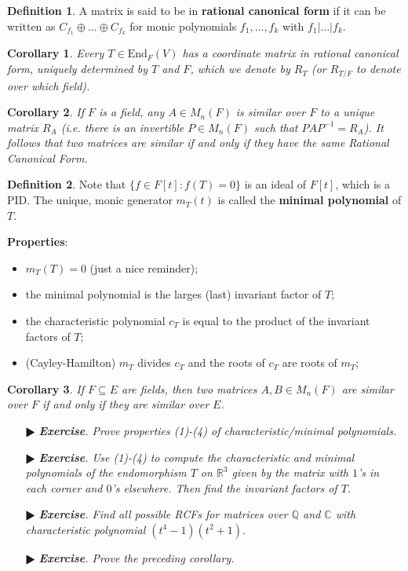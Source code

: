 \documentclass[11pt]{amsart}
\newtheorem*{corollary*}{Corollary}
\theoremstyle{definition}
\newtheorem*{definition*}{Definition}
\renewcommand\:{\colon}
\newcommand{\Q}{\mathds{Q}}
\newcommand{\R}{\mathds{R}}
\newcommand{\1}{\mathds{1}}
\newcommand{\End}{\text{End}}
\newcommand{\exc}[1]{\vspace{-2.5pt}\begin{itemize}[leftmargin=15pt]\item[$\RHD$] \textit{\textbf{Exercise}. #1}\end{itemize}}
\begin{document}
\begin{definition*}
	A matrix is said to be in \textbf{rational canonical form} if it can be written as $C_{f_1} \oplus \dots \oplus C_{f_k}$ for monic polynomials $f_1, \dots, f_k$ with $f_1 | \dots | f_k$.
\end{definition*}

\begin{corollary*}
	Every $T \in \End_F(V)$ has a coordinate matrix in rational canonical form, uniquely determined by $T$ and $F$, which we denote by $R_T$ (or $R_{T/F}$ to denote over which field).
\end{corollary*}

\begin{corollary*}
	If $F$ is a field, any $A \in M_n(F)$ is similar over $F$ to a unique matrix $R_A$ (i.e. there is an invertible $P \in M_n(F)$ such that $PAP^{-1} = R_A$). It follows that two matrices are similar if and only if they have the same Rational Canonical Form.
\end{corollary*}

\begin{definition*}
	Note that $\{ f \in F[t] : f(T) = 0 \}$ is an ideal of $F[t]$, which is a PID. The unique, monic generator $m_T(t)$ is called the \textbf{minimal polynomial} of $T$.
\end{definition*}

\noindent \textbf{Properties}:
\begin{itemize}[leftmargin=*]\setlength\itemsep{0em}
	\item $m_T(T) = 0$ (just a nice reminder);
	\item the minimal polynomial is the larges (last) invariant factor of $T$;
	\item the characteristic polynomial $c_T$ is equal to the product of the invariant factors of $T$;
	\item (Cayley-Hamilton) $m_T$ divides $c_T$ and the roots of $c_T$ are roots of $m_T$;
\end{itemize}

\begin{corollary*}
	If $F \subseteq E$ are fields, then two matrices $A, B \in M_n(F)$ are similar over $F$ if and only if they are similar over $E$.
\end{corollary*}

\clearpage %

\exc{Prove properties (1)-(4) of characteristic/minimal polynomials.}
\exc{Use (1)-(4) to compute the characteristic and minimal polynomials of the endomorphism $T$ on $\R^3$ given by the matrix with $1$'s in each corner and $0$'s elsewhere. Then find the invariant factors of $T$.}
\exc{Find all possible RCFs for matrices over $\Q$ and $\mathds C$ with characteristic polynomial $(t^4 - 1)(t^2 + 1)$.}
\exc{Prove the preceding corollary.}
\end{document}
